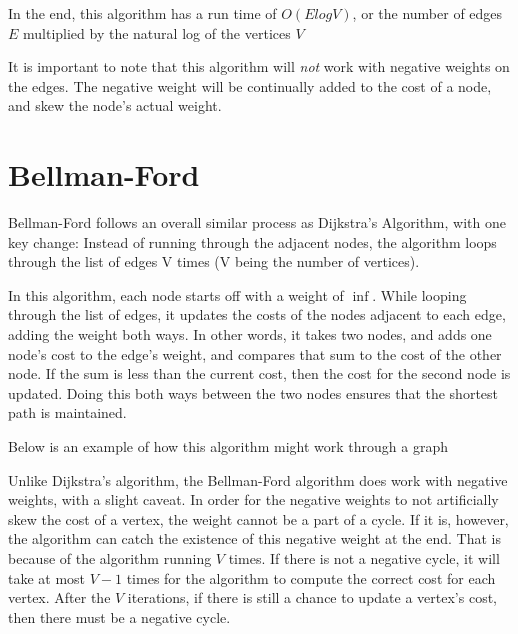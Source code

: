 In the end, this algorithm has a run time of $O(E log V)$, or the number of edges $E$ multiplied by the natural log of the vertices $V$

It is important to note that this algorithm will \emph{not} work with negative weights on the edges. The negative weight will be continually added to the cost of a node, and skew the node's actual weight.


\section{Bellman-Ford}

Bellman-Ford follows an overall similar process as Dijkstra's Algorithm, with one key change: Instead of running through the adjacent nodes, the algorithm loops through the list of edges V times (V being the number of vertices). 

In this algorithm, each node starts off with a weight of $\inf$. While looping through the list of edges, it updates the costs of the nodes adjacent to each edge, adding the weight both ways. In other words, it takes two nodes, and adds one node's cost to the edge's weight, and compares that sum to the cost of the other node. If the sum is less than the current cost, then the cost for the second node is updated. Doing this both ways between the two nodes ensures that the shortest path is maintained.

Below is an example of how this algorithm might work through a graph






Unlike Dijkstra's algorithm, the Bellman-Ford algorithm does work with negative weights, with a slight caveat. In order for the negative weights to not artificially skew the cost of a vertex, the weight cannot be a part of a cycle. If it is, however, the algorithm can catch the existence of this negative weight at the end. That is because of the algorithm running $V$ times. If there is not a negative cycle, it will take at most $V-1$ times for the algorithm to compute the correct cost for each vertex. After the $V$ iterations, if there is still a chance to update a vertex's cost, then there must be a negative cycle.